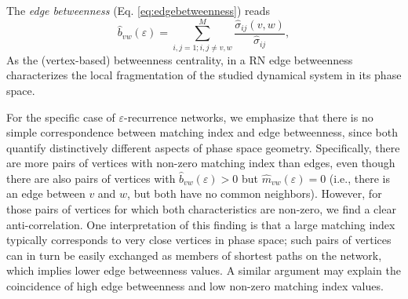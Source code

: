 The \textit{edge betweenness}  (Eq. \eqref{eq:edgebetweenness}) reads
\begin{equation}
\hat{b}_{vw}(\varepsilon)=\sum_{i,j=1; i,j\neq v,w}^M \frac{\hat{\sigma}_{ij}(v,w)}{\hat{\sigma}_{ij}},
\label{eq:edgebetweennessRN}
\end{equation}
\noindent
As the (vertex-based) betweenness centrality, in a RN edge betweenness characterizes the local fragmentation of the studied dynamical system in its phase space.
        
For the specific case of $\varepsilon$-recurrence networks, we emphasize that there is no simple correspondence between matching index and edge betweenness, since both quantify distinctively different aspects of phase space geometry. Specifically, there are more pairs of vertices with non-zero matching index than edges, even though there are also pairs of vertices with $\hat{b}_{vw}(\varepsilon)>0$ but $\hat{m}_{vw}(\varepsilon)=0$ (i.e., there is an edge between $v$ and $w$, but both have no common neighbors). However, for those pairs of vertices for which both characteristics are non-zero, we find a clear anti-correlation. One interpretation of this finding is that a large matching index typically corresponds to very close vertices in phase space; such pairs of vertices can in turn be easily exchanged as members of shortest paths on the network, which implies lower edge betweenness values. A similar argument may explain the coincidence of high edge betweenness and low non-zero matching index values.
      
